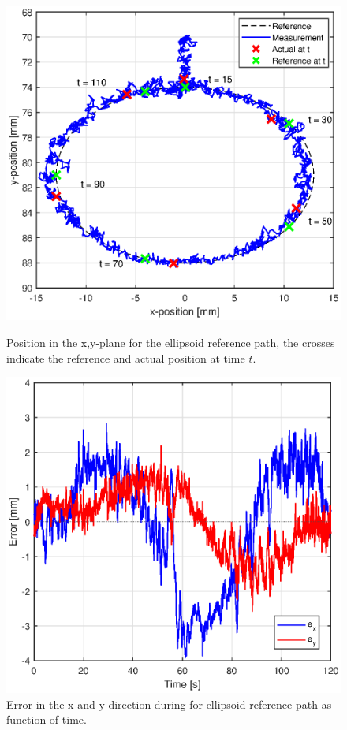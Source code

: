 \begin{figure}[H] 
    \begin{minipage}[b]{0.49\linewidth}
    \centering
    \includegraphics[width = \textwidth]{Figures/Chapter5/xy.eps}
    \caption{Position in the x,y-plane for the ellipsoid reference path, the crosses indicate the reference and actual position at time $t$.}
    \label{fig5:xyelips}
       \end{minipage} 
    \begin{minipage}[b]{0.49\linewidth}
    \centering
    \includegraphics[width = \textwidth]{Figures/Chapter5/errorxy.eps}
    \caption{Error in the x and y-direction during for ellipsoid reference path as function of time.}
    \label{fig5:errorelips}
    \end{minipage} 
\end{figure}



